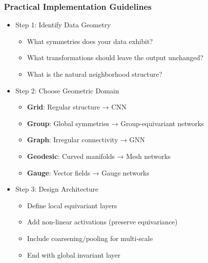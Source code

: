 \begin{frame}[fragile]\frametitle{Practical Implementation Guidelines}


\begin{itemize}
\item Step 1: Identify Data Geometry
	\begin{itemize}
	\item What symmetries does your data exhibit?
	\item What transformations should leave the output unchanged?
	\item What is the natural neighborhood structure?
	\end{itemize}
\item Step 2: Choose Geometric Domain
	\begin{itemize}
	\item \textbf{Grid}: Regular structure → CNN
	\item \textbf{Group}: Global symmetries → Group-equivariant networks
	\item \textbf{Graph}: Irregular connectivity → GNN
	\item \textbf{Geodesic}: Curved manifolds → Mesh networks
	\item \textbf{Gauge}: Vector fields → Gauge networks
	\end{itemize}
\item Step 3: Design Architecture
	\begin{itemize}
	\item Define local equivariant layers
	\item Add non-linear activations (preserve equivariance)
	\item Include coarsening/pooling for multi-scale
	\item End with global invariant layer
	\end{itemize}
\end{itemize}

\end{frame}

